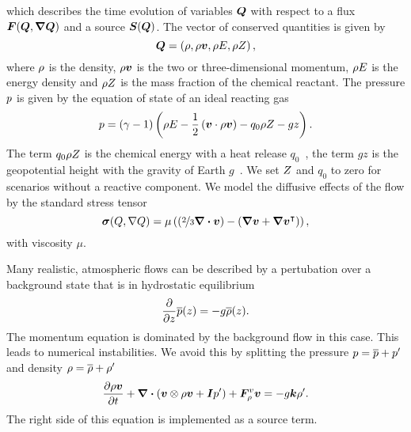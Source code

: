 \documentclass[runningheads]{llncs}
\begin{document}
which describes the time evolution of variables $\bm{Q}$ with respect to a flux $\flux(\Q, \gradQ)$ and a source $\source(\Q)$.
The vector of conserved quantities is given by
\begin{equation}
  \label{eq:conserved-variables}
 \bm{Q} = \left( \rho, \rho \bm{v}, \rho E, \rho Z \right),
\end{equation}
where $\rho$ is the density, $\rho \bm{v}$ is the two or three-dimensional momentum, $\rho E$ is the energy density and $\rho Z$ is the mass fraction of the chemical reactant.
The pressure $p$ is given by the equation of state of an ideal reacting gas
\begin{equation}
  \label{eq:eos}
  p = (\gamma - 1) \left(\rho E - \frac{1}{2} \left(\bm{v} \cdot \rho \bm{v} \right)  - q_0 \rho Z - gz \right).
\end{equation}
The term $q_0 \rho Z$ is the chemical energy with a heat release $q_0$~\cite{helzel2000modified}, the term $gz$ is the geopotential height with the gravity of Earth $g$~\cite{giraldo2008study}.
We set $Z$ and $q_0$ to zero for scenarios without a reactive component.
We model the diffusive effects of the flow by the standard stress tensor
\begin{equation}
  \label{eq:stress-tensor}
  \stressT(Q, \nabla Q) =
  \mu
  \left(
  \left(\nicefrac{2}{3} \divergence{\Qv} \right) -
  \left( \gradient{\Qv} + \gradient{\Qv}^\intercal \right)
  \right),
\end{equation}
with viscosity $\mu$.

Many realistic, atmospheric flows can be described by a pertubation over a background state that is in hydrostatic equilibrium
\newcommand{\backgroundPressure}{\overline{\pressure}}
\newcommand{\backgroundRho}{\overline{\Qrho}}
\begin{equation}
  \label{eq:hydrostatic-balance}
  \pdv{}{z} \backgroundPressure{\left (z \right )} = -g \backgroundRho(z).
\end{equation}
The momentum equation is dominated by the background flow in this case.
This leads to numerical instabilities.
We avoid this by splitting the pressure $\pressure = \backgroundPressure + \pressure'$ and density $\Qrho = \backgroundRho + \Qrho'$
\begin{equation}
  \label{eq:momentum-equation-split}
  \pdv{\Qj}{t}+ \divergence{ \left(
    \Qv \otimes \Qj + \bm{I} \pressure'
    \right)
  } + \viscFlux_\Qj
  =
  -g \bm{k} \Qrho'.
\end{equation}
The right side of this equation is implemented as a source term.
\end{document}
